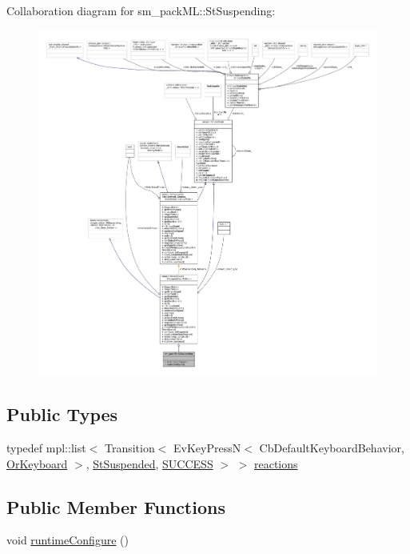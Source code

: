 Collaboration diagram for sm\+\_\+pack\+ML\+:\+:St\+Suspending\+:
\nopagebreak
\begin{figure}[H]
\begin{center}
\leavevmode
\includegraphics[width=350pt]{structsm__packML_1_1StSuspending__coll__graph}
\end{center}
\end{figure}
\subsection*{Public Types}
\begin{DoxyCompactItemize}
\item 
typedef mpl\+::list$<$ Transition$<$ Ev\+Key\+PressN$<$ Cb\+Default\+Keyboard\+Behavior, \hyperlink{classsm__packML_1_1OrKeyboard}{Or\+Keyboard} $>$, \hyperlink{structsm__packML_1_1StSuspended}{St\+Suspended}, \hyperlink{classSUCCESS}{S\+U\+C\+C\+E\+SS} $>$ $>$ \hyperlink{structsm__packML_1_1StSuspending_a7d125f0546ec2381647db59d49f706b7}{reactions}
\end{DoxyCompactItemize}
\subsection*{Public Member Functions}
\begin{DoxyCompactItemize}
\item 
void \hyperlink{structsm__packML_1_1StSuspending_a5c6c8a89752377395f61d822a2239f80}{runtime\+Configure} ()
\end{DoxyCompactItemize}
